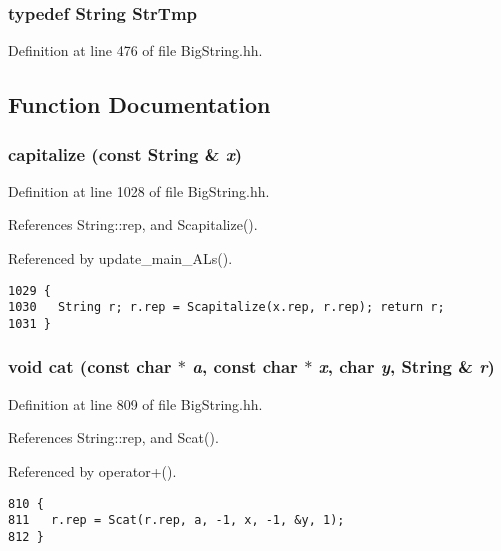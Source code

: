 \subsubsection{\setlength{\rightskip}{0pt plus 5cm}typedef {\bf String} Str\-Tmp}\label{BigString_8hh_a13}




Definition at line 476 of file Big\-String.hh.

\subsection{Function Documentation}
\subsubsection{ capitalize (const {\bf String} \& {\em x})\hspace{0.3cm}{\tt  [inline]}}\label{BigString_8hh_a84}




Definition at line 1028 of file Big\-String.hh.

References String::rep, and Scapitalize().

Referenced by update\_\-main\_\-ALs().



\footnotesize\begin{verbatim}1029 {
1030   String r; r.rep = Scapitalize(x.rep, r.rep); return r;
1031 }
\end{verbatim}\normalsize 
{}
\subsubsection{\setlength{\rightskip}{0pt plus 5cm}void cat (const char $\ast$ {\em a}, const char $\ast$ {\em x}, char {\em y}, {\bf String} \& {\em r})\hspace{0.3cm}{\tt  [inline]}}\label{BigString_8hh_a69}




Definition at line 809 of file Big\-String.hh.

References String::rep, and Scat().

Referenced by operator+().



\footnotesize\begin{verbatim}810 {
811   r.rep = Scat(r.rep, a, -1, x, -1, &y, 1);
812 }
\end{verbatim}\normalsize 
{}
